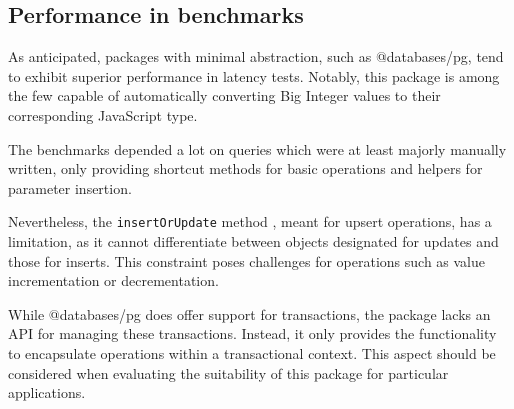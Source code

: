 \subsection*{Performance in benchmarks}
As anticipated, packages with minimal abstraction, such as @databases/pg, tend
to exhibit superior performance in latency tests. Notably, this package is among
the few capable of automatically converting Big Integer values to their
corresponding JavaScript type.

The benchmarks depended a lot on queries which were at least majorly manually
written, only providing shortcut methods for basic operations and helpers for
parameter insertion.

Nevertheless, the \texttt{insertOrUpdate} method \cite{databases/pg}, meant for
upsert operations, has a limitation, as it cannot differentiate between objects
designated for updates and those for inserts. This constraint poses challenges
for operations such as value incrementation or decrementation.

While @databases/pg does offer support for transactions, the package lacks an
API for managing these transactions. Instead, it only provides the functionality
to encapsulate operations within a transactional context. This aspect should be
considered when evaluating the suitability of this package for particular
applications.
